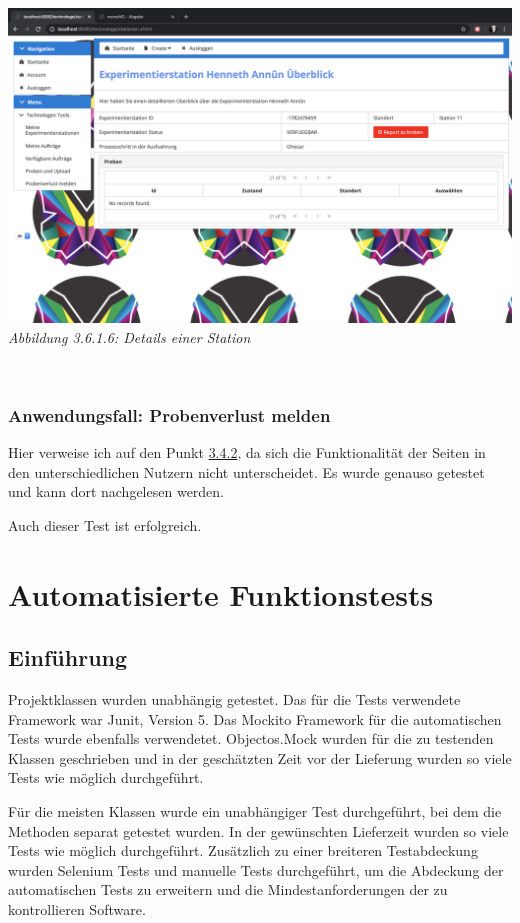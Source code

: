 \documentclass[enabledeprecatedfontcommands,fontsize=12pt,paper=a4,twoside]{scrartcl}
\begin{document}
 \hypertarget{sc3.6.1.6}{
\includegraphics[width=1\textwidth]{Screenshots/3616.png}
\textit{Abbildung 3.6.1.6: Details einer Station}
} \\


\subsubsection{Anwendungsfall: Probenverlust melden}

Hier verweise ich auf den Punkt \hyperlink{3.4.2}{3.4.2}, da sich die Funktionalität der Seiten in den unterschiedlichen Nutzern nicht unterscheidet. Es wurde genauso getestet und kann dort nachgelesen werden. 

Auch dieser Test ist erfolgreich. 


\newpage
\section{Automatisierte Funktionstests}

\subsection{Einführung}

Projektklassen wurden unabhängig getestet. Das für die Tests verwendete
Framework war Junit, Version 5. Das Mockito Framework für die automatischen
Tests wurde ebenfalls verwendetet. Objectos.Mock wurden für die zu testenden
Klassen geschrieben und in der geschätzten Zeit vor der Lieferung wurden so
viele Tests wie möglich durchgeführt.

Für die meisten Klassen wurde ein unabhängiger Test durchgeführt, bei dem die
Methoden separat getestet wurden. In der gewünschten Lieferzeit wurden so viele
Tests wie möglich durchgeführt. Zusätzlich zu einer breiteren Testabdeckung
wurden Selenium Tests und manuelle Tests durchgeführt, um die Abdeckung der
automatischen Tests zu erweitern und die Mindestanforderungen der zu
kontrollieren Software.
\end{document}
